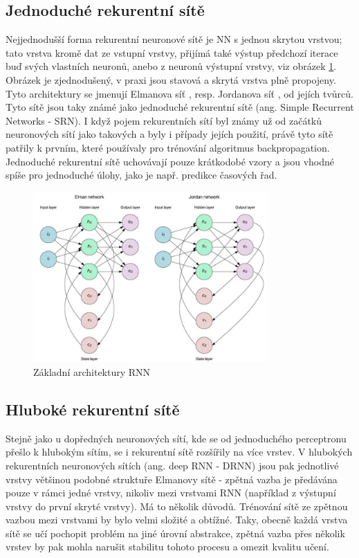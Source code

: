 \subsection{Jednoduché rekurentní sítě}

Nejjednodušší forma rekurentní neuronové sítě je NN s jednou skrytou vrstvou;
tato vrstva kromě dat ze vstupní vrstvy, přijímá také výstup předchozí iterace
buď svých vlastních neuronů, anebo z neuronů výstupní vrstvy, viz obrázek
\ref{fig:rnn}. Obrázek je zjednodušený, v praxi jsou stavová a skrytá vrstva
plně propojeny. Tyto architektury se jmenují Elmanova síť \cite{elman}, resp.
Jordanova síť \cite{jordan}, od jejích tvůrců. Tyto sítě jsou taky známé jako
jednoduché rekurentní sítě (ang. Simple Recurrent Networks - SRN). I když pojem
rekurentních sítí byl známy už od začátků neuronových sítí jako takových a byly
i případy jejích použití, právě tyto sítě patřily k prvním, které používaly pro
trénování algoritmus backpropagation. Jednoduché rekurentní sítě uchovávají
pouze krátkodobé vzory a jsou vhodné spíše pro jednoduché úlohy, jako je např.
predikce časových řad.

\begin{figure}[]
    \centering
    \includegraphics[width=0.8\textwidth]{Figures/rnn.png}
    \caption{Základní architektury RNN \cite{aksoy}}
    \label{fig:rnn}
\end{figure}

\subsection{Hluboké rekurentní sítě}

Stejně jako u dopředných neuronových sítí, kde se od jednoduchého perceptronu
přešlo k hlubokým sítím, se i rekurentní sítě rozšířily na více vrstev. V
hlubokých rekurentních neuronových sítích (ang. deep RNN - DRNN) jsou pak
jednotlivé vrstvy většinou podobné struktuře Elmanovy sítě - zpětná vazba je
předávána pouze v rámci jedné vrstvy, nikoliv mezi vrstvami RNN (například z
výstupní vrstvy do první skryté vrstvy). Má to několik důvodů. Trénování sítě
ze zpětnou vazbou mezi vrstvami by bylo velmi složité a obtížné. Taky, obecně
každá vrstva sítě se učí pochopit problém na jiné úrovní abstrakce, zpětná
vazba přes několik vrstev by pak mohla narušit stabilitu tohoto procesu a
omezit kvalitu učení.

